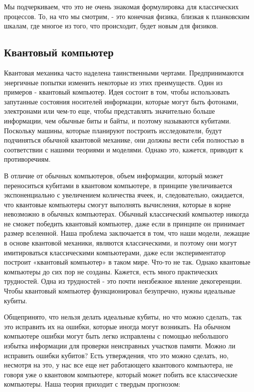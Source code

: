 \documentclass[main.tex]{subfiles}
\begin{document}
Мы подчеркиваем, что это не очень знакомая формулировка для классических процессов. То, на что мы смотрим, - это конечная физика, близкая к планковским шкалам, где многое из того, что происходит, будет новым для физиков.


\subsection{Квантовый компьютер}\label{ch5.8}

Квантовая механика часто наделена таинственными чертами. Предпринимаются энергичные попытки изменить некоторые из этих преимуществ. Один из примеров - квантовый компьютер. Идея состоит в том, чтобы использовать запутанные состояния носителей информации, которые могут быть фотонами, электронами или чем-то еще, чтобы представлять значительно больше информации, чем обычные биты и байты, и поэтому называются кубитами.
Поскольку машины, которые планируют построить исследователи, будут подчиняться обычной квантовой механике, они должны вести себя полностью в соответствии с нашими теориями и моделями. Однако это, кажется, приводит к противоречиям.

В отличие от обычных компьютеров, объем информации, который может переноситься кубитами в квантовом компьютере, в принципе увеличивается экспоненциально с увеличением количества ячеек, и, следовательно, ожидается, что квантовые компьютеры смогут выполнять вычисления, которые в корне невозможно в обычных компьютерах. Обычный классический компьютер никогда не сможет победить квантовый компьютер, даже если в принципе он принимает размер вселенной.
Наша проблема заключается в том, что наши модели, лежащие в основе квантовой механики, являются классическими, и поэтому они могут имитироваться классическими компьютерами, даже если экспериментатор построит «квантовый компьютер» в таком мире. Что-то не так.
Однако квантовые компьютеры до сих пор не созданы. Кажется, есть много практических трудностей. Одна из трудностей - это почти неизбежное явление декогеренции. Чтобы квантовый компьютер функционировал безупречно, нужны идеальные кубиты.

Общепринято, что нельзя делать идеальные кубиты, но что можно сделать, так это исправить их на ошибки, которые иногда могут возникать. На обычном компьютере ошибки могут быть легко исправлены с помощью небольшого избытка информации для проверки неисправных участков памяти. Можно ли исправить ошибки кубитов? Есть утверждения, что это можно сделать, но, несмотря на это, у нас все еще нет работающего квантового компьютера, не говоря уже о квантовом компьютере, который может побить все классические компьютеры. Наша теория приходит с твердым прогнозом:
\end{document}
